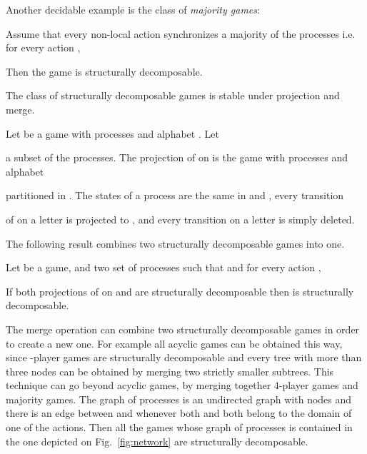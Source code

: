\documentclass[a4paper,UKenglish]{lipics-v2016}
\begin{document}
Another decidable example is the class of \emph{majority games}:
\begin{lemma}\label{lem:majority}
Assume that every non-local action synchronizes a majority of the processes i.e. for every action ,

Then the game is  structurally decomposable.
\end{lemma}












The class of structurally decomposable games
is stable under projection and merge.

\begin{definition}
Let  be a game with processes  and
alphabet .
Let 

a subset of the processes.
The projection of  on  is the game 
with processes  and alphabet

partitioned in .
The states of a process  are the same in  and , every transition 

of  on a letter 
is projected to ,
and every transition on a letter  is simply deleted.
\end{definition}

The following result combines two structurally decomposable games into one.


\begin{lemma}\label{lem:merging}
Let  be a game,
and 
 two set of processes such that  and for every action ,

If both projections of  on  and  are structurally decomposable then  is structurally decomposable.
\end{lemma}

The merge operation can combine two structurally decomposable games in order to create a new one.
For example all acyclic games can be obtained this way,
since -player games are structurally decomposable
and every tree with more than three 
nodes
can be obtained by merging two strictly smaller subtrees.
This technique can go beyond acyclic games,
by merging together 4-player games
and majority games.
The graph of processes is an undirected graph with nodes 
 and there is an edge between  and 
whenever both  and  both belong to the domain of one of the actions.
Then all the games whose graph of processes
is contained in the one depicted on Fig.~\ref{fig:network} are structurally decomposable.
\end{document}

